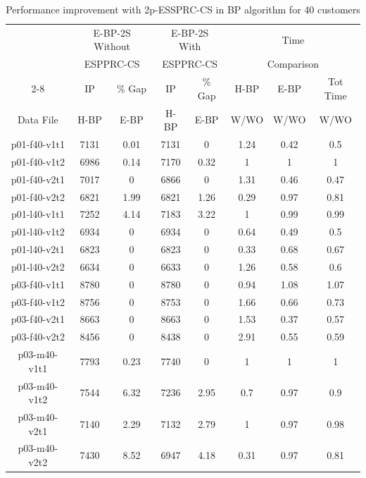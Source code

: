 \begin{table}[!h]
\centering
\caption{Performance improvement with 2p-ESSPRC-CS in BP algorithm for 40 customers}\label{compexp-comp-pri3}
\begin {tabular}[h]{|c|c|c|c|c|c|c|c|}
\hline
\mbox{} & \multicolumn{2}{|c|}{E-BP-2S Without} & \multicolumn{2}{|c|}{E-BP-2S With} & \multicolumn{3}{|c|}{Time}\\
\mbox{} & \multicolumn{2}{|c|}{ESPPRC-CS} & \multicolumn{2}{|c|}{ESPPRC-CS} & \multicolumn{3}{|c|}{Comparison}\\\cline{2-8}
\mbox{}   & IP    & \% Gap   & IP      & \% Gap & H-BP  & E-BP & Tot Time \\
Data File &  H-BP & E-BP     & H-BP    & E-BP   & W/WO  & W/WO & W/WO \\\hline
p01-f40-v1t1 &  7131    & 0.01  & 7131  & 0 & 1.24  & 0.42  & 0.5   \\
p01-f40-v1t2 &  6986    & 0.14  & 7170  & 0.32  & 1 & 1 & 1 \\
p01-f40-v2t1 &  7017    & 0 & 6866  & 0 & 1.31  & 0.46  & 0.47  \\
p01-f40-v2t2 &  6821    & 1.99  & 6821  & 1.26  & 0.29  & 0.97  & 0.81  \\\hline
p01-l40-v1t1 &  7252    & 4.14  & 7183  & 3.22  & 1 & 0.99  & 0.99  \\
p01-l40-v1t2 &  6934    & 0 & 6934  & 0 & 0.64  & 0.49  & 0.5   \\
p01-l40-v2t1 &  6823    & 0 & 6823  & 0 & 0.33  & 0.68  & 0.67  \\
p01-l40-v2t2 &  6634    & 0 & 6633  & 0 & 1.26  & 0.58  & 0.6   \\\hline
p03-f40-v1t1 &  8780    & 0 & 8780  & 0 & 0.94  & 1.08  & 1.07  \\
p03-f40-v1t2 &  8756    & 0 & 8753  & 0 & 1.66  & 0.66  & 0.73  \\
p03-f40-v2t1 &  8663    & 0 & 8663  & 0 & 1.53  & 0.37  & 0.57  \\
p03-f40-v2t2 &  8456    & 0 & 8438  & 0 & 2.91  & 0.55  & 0.59  \\\hline
p03-m40-v1t1 &  7793    & 0.23  & 7740  & 0 & 1 & 1 & 1 \\
p03-m40-v1t2 &  7544    & 6.32  & 7236  & 2.95  & 0.7   & 0.97  & 0.9   \\
p03-m40-v2t1 &  7140    & 2.29  & 7132  & 2.79  & 1 & 0.97  & 0.98  \\
p03-m40-v2t2 &  7430    & 8.52  & 6947  & 4.18  & 0.31  & 0.97  & 0.81  \\\hline

\end{tabular}
\end{table}
